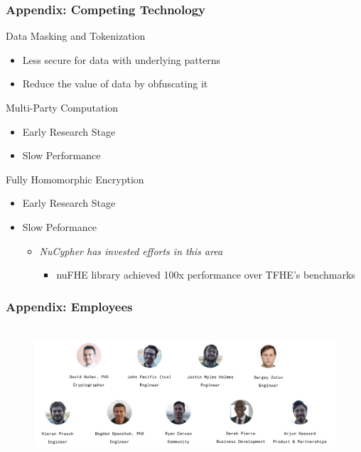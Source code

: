 \documentclass[xetex,mathsans,sans,aspectratio=169]{beamer}
\begin{document}
    \begin{frame}
      \frametitle{Appendix: Competing Technology}
       Data Masking and Tokenization
       \begin{itemize}
           \item Less secure for data with underlying patterns
           \item Reduce the value of data by obfuscating it
       \end{itemize}

       Multi-Party Computation
       \begin{itemize}
           \item Early Research Stage
           \item Slow Performance
       \end{itemize}
      
       Fully Homomorphic Encryption
       \begin{itemize}
           \item Early Research Stage
           \item Slow Peformance
           \begin{itemize}
               \item \emph{NuCypher has invested efforts in this area}
                 \begin{itemize}
                   \item nuFHE library achieved 100x performance over TFHE’s benchmarks
                 \end{itemize}
           \end{itemize}
       \end{itemize}
     \end{frame}

    \begin{frame}
      \frametitle{Appendix: Employees}
      \begin{figure}
        \centering
        \includegraphics[height=5cm]{pdf/employees.pdf}
      \end{figure}
    \end{frame}
\end{document}
